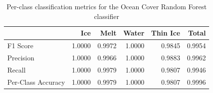 \begin{table}
\label{tab:rf_classification_metrics}
\begin{tabular*}{\textwidth}{@{\extracolsep{\fill}}lrrrrr}
\toprule
 & Ice & Melt & Water & Thin Ice & Total \\
\midrule
F1 Score & 1.0000 & 0.9972 & 1.0000 & 0.9845 & 0.9954 \\
Precision & 1.0000 & 0.9966 & 1.0000 & 0.9883 & 0.9962 \\
Recall & 1.0000 & 0.9979 & 1.0000 & 0.9807 & 0.9946 \\
Per-Class Accuracy & 1.0000 & 0.9979 & 1.0000 & 0.9807 & 0.9996 \\
\bottomrule
\end{tabular*}
\caption{Per-class classification metrics for the Ocean Cover Random Forest classifier}
\end{table}